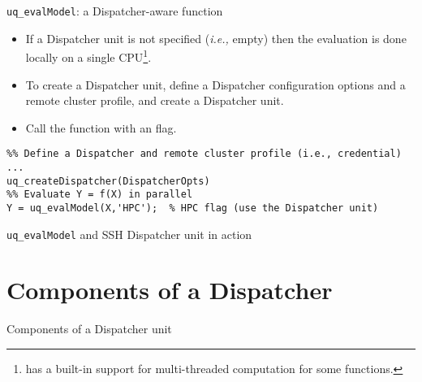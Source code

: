 \documentclass{rsuqbeamernew}
\begin{document}
\begin{frame}[fragile,t]{\texttt{uq\_evalModel}: a Dispatcher-aware function}
	\small

  \begin{itemize}
    \item If a Dispatcher unit is not specified (\emph{i.e.,} empty) then the evaluation is done locally on a single CPU\footnote{\matlab{} has a built-in support for multi-threaded computation for some functions.}.
    \item To create a Dispatcher unit, define a Dispatcher configuration options and a remote cluster profile, and create a Dispatcher unit.
    \item Call the function with an  flag.
  \end{itemize}

\begin{lstlisting}
%% Define a Dispatcher and remote cluster profile (i.e., credential)
...
uq_createDispatcher(DispatcherOpts) 
%% Evaluate Y = f(X) in parallel
Y = uq_evalModel(X,'HPC');  % HPC flag (use the Dispatcher unit)
\end{lstlisting}

\end{frame}

\begin{frame}[t]{\texttt{uq\_evalModel} and SSH Dispatcher unit in action}
  \small
\end{frame}

\section{Components of a Dispatcher}
\begin{frame}[t]{Components of a Dispatcher unit}
  \small
\end{frame}
\end{document}
